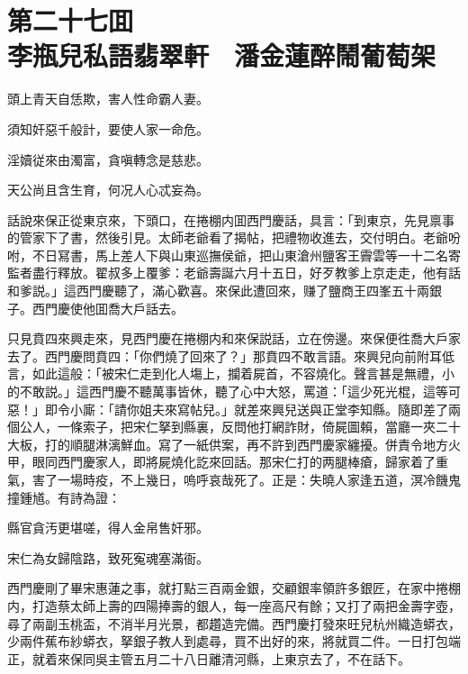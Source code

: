 
\chapter*{第二十七囬　\\李瓶兒私語翡翠軒　潘金蓮醉鬧葡萄架}


\begin{myquote}
頭上青天自恁欺，害人性命霸人妻。

須知奸惡千般計，要使人家一命危。

淫嬻従來由濁富，貪嗔轉念是慈悲。

天公尚且含生育，何况人心忒妄為。
\end{myquote}

話說來保正從東京來，下頭口，在捲棚内囬西門慶話，具言：「到東京，先見禀事的管家下了書，然後引見。太師老爺看了揭帖，把禮物收進去，交付明白。老爺吩咐，不日冩書，馬上差人下與山東巡撫侯爺，把山東滄州鹽客王霽雲等一十二名寄監者盡行釋放。翟叔多上覆爹：老爺壽誕六月十五日，好歹教爹上京走走，他有話和爹説。」這西門慶聽了，滿心歡喜。來保此遭回來，赚了鹽商王四峯五十兩銀子。西門慶使他囬喬大戶話去。

只見賁四來興走來，見西門慶在捲棚内和來保説話，立在傍邊。來保便徃喬大戶家去了。西門慶問賁四：「你們燒了回來了？」那賁四不敢言語。來興兒向前附耳低言，如此這般：「被宋仁走到化人塲上，攔着屍首，不容燒化。聲言甚是無禮，小的不敢説。」這西門慶不聽萬事皆休，聽了心中大怒，罵道：「這少死光棍，這等可惡！」即令小廝：「請你姐夫來寫帖兒。」就差來興兒送與正堂李知縣。隨即差了兩個公人，一條索子，把宋仁拏到縣裏，反問他打網詐財，倚屍圖賴，當廳一夾二十大板，打的順腿淋漓鮮血。寫了一紙供案，再不許到西門慶家纏擾。併責令地方火甲，眼同西門慶家人，即將屍燒化訖來回話。那宋仁打的两腿棒瘡，歸家着了重氣，害了一場時疫，不上幾日，嗚呼哀哉死了。正是：失曉人家逢五道，溟冷饑鬼撞鍾馗。有詩為證：

\begin{myquote}
縣官貪汚更堪嗟，得人金帛售奸邪。

宋仁為女歸陰路，致死寃魂塞滿衙。
\end{myquote}

西門慶剛了畢宋惠蓮之事，就打點三百兩金銀，交顧銀率領許多銀匠，在家中捲棚内，打造蔡太師上壽的四陽捧壽的銀人，每一座高尺有餘；又打了兩把金壽字壺，尋了兩副玉桃盃，不消半月光景，都趲造完備。西門慶打發來旺兒杭州織造蟒衣，少兩件蕉布紗蟒衣，拏銀子教人到處尋，買不出好的來，將就買二件。一日打包端正，就着來保同吳主管五月二十八日離清河縣，上東京去了，不在話下。

